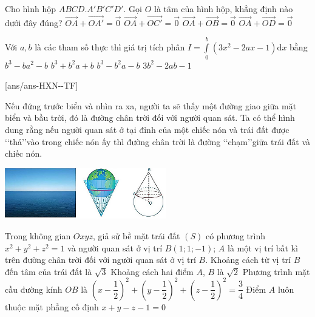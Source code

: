 \begin{ex}%
 Cho hình hộp $ABCD.A'B'C'D'$. Gọi $O$ là tâm của hình hộp, khẳng định nào dưới đây đúng?
 \choice
 {$\overrightarrow{OA}+\overrightarrow{O{A}'}=\overrightarrow{0}$}
 {\True $\overrightarrow{OA}+\overrightarrow{O{C}'}=\overrightarrow{0}$}
 {$\overrightarrow{OA}+\overrightarrow{OB}=\overrightarrow{0}$}
 {$\overrightarrow{OA}+\overrightarrow{OD}=\overrightarrow{0}$}
\end{ex}
\begin{ex}%
 Với $ a,b$ là các tham số thực thì giá trị tích phân $ I=\int\limits_0^b{\left(3x^2-2ax-1\right)\text{d}x}$ bằng
 \choice
 {$b^3-b{a^2}-b$}
 {$b^3+b^2a+b$}
 {\True $b^3-b^2a-b$}
 {$ 3b^2-2ab-1$}
 \end{ex}
\cauds
{}[ans/ans-HXN-\sode-TF]
\begin{ex}%
Nếu đứng trước biển và nhìn ra xa, người ta sẽ thấy một đường giao giữa mặt biển và bầu trời, đó là đường chân trời đối với người quan sát. Ta có thể hình dung rằng nếu người quan sát ở tại đỉnh của một chiếc nón và trái đất được \lq\lq thả\rq\rq vào trong chiếc nón ấy thì đường chân trời là đường \lq\lq chạm\rq\rq giữa trái đất và chiếc nón.\\
\centerline{
 \includegraphics[width=7cm]{img/HXN-13-13}
}
Trong không gian $Oxyz$, giả sử bề mặt trái đất $(S)$ có phương trình $x^2+y^2+z^2=1$ và người quan sát ở vị trí $ B\left(1;1;-1\right)$; $A$ là một vị trí bất kì trên đường chân trời đối với người quan sát ở vị trí $B$.
 \choiceTF
 {\True Khoảng cách từ vị trí $B$ đến tâm của trái đất là $\sqrt{3}$}
 {\True Khoảng cách hai điểm $A$, $B$ là $\sqrt{2}$}
 {Phương trình mặt cầu đường kính $OB$ là $\left(x-\dfrac{1}{2}\right)^2+\left(y-\dfrac{1}{2}\right)^2+\left(z-\dfrac{1}{2}\right)^2=\dfrac{3}{4}$}
 {\True Điểm $A$ luôn thuộc mặt phẳng cố định $ x+y-z-1=0$}
\end{ex}
